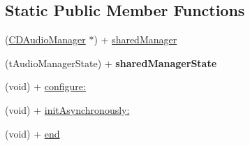\subsection*{Static Public Member Functions}
\begin{DoxyCompactItemize}
\item 
(\hyperlink{interface_c_d_audio_manager}{C\-D\-Audio\-Manager} $\ast$) + \hyperlink{interface_c_d_audio_manager_a757b69bd4a902166b3ffa81ea85ba6e8}{shared\-Manager}
\item 
\hypertarget{interface_c_d_audio_manager_a836401e9feed55d2276e880e5aca13fa}{(t\-Audio\-Manager\-State) + {\bfseries shared\-Manager\-State}}\label{interface_c_d_audio_manager_a836401e9feed55d2276e880e5aca13fa}

\item 
(void) + \hyperlink{interface_c_d_audio_manager_a4565c81bdaefd40cad943440c7a438ab}{configure\-:}
\item 
(void) + \hyperlink{interface_c_d_audio_manager_a208d173cd07d3ace248aff4bb16839b9}{init\-Asynchronously\-:}
\item 
(void) + \hyperlink{interface_c_d_audio_manager_a0d1e25778a1823456c3d65219a7d0562}{end}
\end{DoxyCompactItemize}
